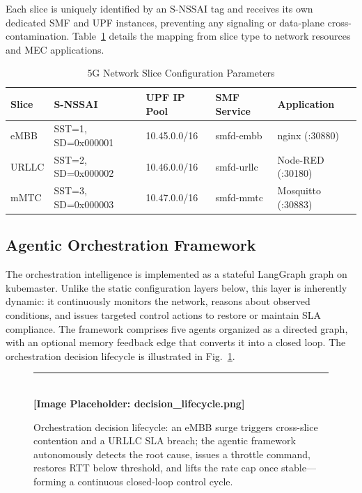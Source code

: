 \documentclass[12pt]{article}
\begin{document}
Each slice is uniquely identified by an S-NSSAI tag and receives its own
dedicated SMF and UPF instances, preventing any signaling or data-plane
cross-contamination. Table~\ref{tab:slices} details the mapping from
slice type to network resources and MEC applications.

\begin{table}[H]
\centering
\caption{5G Network Slice Configuration Parameters}
\label{tab:slices}
\begin{tabular}{@{}lllll@{}}
\toprule
\textbf{Slice} & \textbf{S-NSSAI} & \textbf{UPF IP Pool} &
\textbf{SMF Service} & \textbf{Application} \\
\midrule
eMBB  & SST=1, SD=0x000001 & 10.45.0.0/16 & smfd-embb  & nginx (:30880) \\
URLLC & SST=2, SD=0x000002 & 10.46.0.0/16 & smfd-urllc & Node-RED (:30180) \\
mMTC  & SST=3, SD=0x000003 & 10.47.0.0/16 & smfd-mmtc  & Mosquitto (:30883) \\
\bottomrule
\end{tabular}
\end{table}

\subsection{Agentic Orchestration Framework}

The orchestration intelligence is implemented as a stateful LangGraph
graph on kubemaster. Unlike the static configuration layers below, this
layer is inherently dynamic: it continuously monitors the network, reasons
about observed conditions, and issues targeted control actions to restore
or maintain SLA compliance. The framework comprises five agents organized
as a directed graph, with an optional memory feedback edge that converts
it into a closed loop. The orchestration decision lifecycle is illustrated
in Fig.~\ref{fig:lifecycle}.

\begin{figure}[H]
\centering
\rule{\textwidth}{6cm} \\ \vspace{0.5em}\centering\textbf{[Image Placeholder: decision\_lifecycle.png]}
\caption{Orchestration decision lifecycle: an eMBB surge triggers
cross-slice contention and a URLLC SLA breach; the agentic framework
autonomously detects the root cause, issues a throttle command, restores
RTT below threshold, and lifts the rate cap once stable---forming a
continuous closed-loop control cycle.}
\label{fig:lifecycle}
\end{figure}
\end{document}
